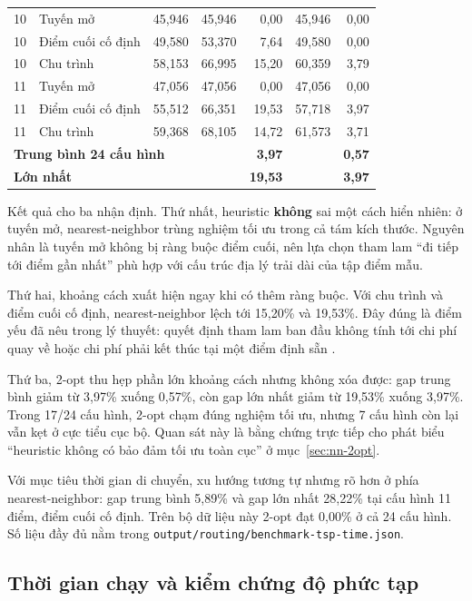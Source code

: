 \begin{longtable}{r l r r r r r}
10 & Tuyến mở & 45,946 & 45,946 & 0,00 & 45,946 & 0,00 \\
10 & Điểm cuối cố định & 49,580 & 53,370 & 7,64 & 49,580 & 0,00 \\
10 & Chu trình & 58,153 & 66,995 & 15,20 & 60,359 & 3,79 \\
11 & Tuyến mở & 47,056 & 47,056 & 0,00 & 47,056 & 0,00 \\
11 & Điểm cuối cố định & 55,512 & 66,351 & 19,53 & 57,718 & 3,97 \\
11 & Chu trình & 59,368 & 68,105 & 14,72 & 61,573 & 3,71 \\
\midrule
\multicolumn{4}{l}{\textbf{Trung bình 24 cấu hình}} & \textbf{3,97} & &
\textbf{0,57} \\
\multicolumn{4}{l}{\textbf{Lớn nhất}} & \textbf{19,53} & & \textbf{3,97} \\
\bottomrule
\end{longtable}
\normalsize
\setlength{\tabcolsep}{6pt}

Kết quả cho ba nhận định. Thứ nhất, heuristic \textbf{không} sai một cách hiển
nhiên: ở tuyến mở, nearest-neighbor trùng nghiệm tối ưu trong cả tám kích thước.
Nguyên nhân là tuyến mở không bị ràng buộc điểm cuối, nên lựa chọn tham lam
``đi tiếp tới điểm gần nhất'' phù hợp với cấu trúc địa lý trải dài của tập điểm
mẫu.

Thứ hai, khoảng cách xuất hiện ngay khi có thêm ràng buộc. Với chu trình và điểm
cuối cố định, nearest-neighbor lệch tới 15,20\% và 19,53\%. Đây đúng là điểm yếu
đã nêu trong lý thuyết: quyết định tham lam ban đầu không tính tới chi phí quay
về hoặc chi phí phải kết thúc tại một điểm định sẵn \cite{rosenkrantz1977}.

Thứ ba, 2-opt thu hẹp phần lớn khoảng cách nhưng không xóa được: gap trung bình
giảm từ 3,97\% xuống 0,57\%, còn gap lớn nhất giảm từ 19,53\% xuống 3,97\%. Trong
17/24 cấu hình, 2-opt chạm đúng nghiệm tối ưu, nhưng 7 cấu hình còn lại vẫn kẹt ở
cực tiểu cục bộ. Quan sát này là bằng chứng trực tiếp cho phát biểu ``heuristic
không có bảo đảm tối ưu toàn cục'' ở mục~\ref{sec:nn-2opt}.

Với mục tiêu thời gian di chuyển, xu hướng tương tự nhưng rõ hơn ở phía
nearest-neighbor: gap trung bình 5,89\% và gap lớn nhất 28,22\% tại cấu hình 11
điểm, điểm cuối cố định. Trên bộ dữ liệu này 2-opt đạt 0,00\% ở cả 24 cấu hình.
Số liệu đầy đủ nằm trong \texttt{output/routing/benchmark-tsp-time.json}.

\subsection{Thời gian chạy và kiểm chứng độ phức tạp}

